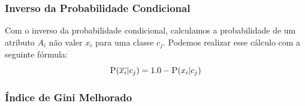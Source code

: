 \subsubsection{Inverso da Probabilidade Condicional}%
\label{subsubsection::pc'}
Com o inverso da probabilidade condicional, calculamos a probabilidade de um atributo $A_i$ não valer $x_i$ para uma classe $c_j$. Podemos realizar esse cálculo com a seguinte fórmula:
\begin{equation}\label{eqn::plinhattalquec}
 \textsc{P}(\overline{x_i}|c_j) = 1.0 - \textsc{P}(x_i|c_j)
\end{equation}

\subsubsection{Índice de Gini Melhorado} %
\label{subsubsection::gini}

